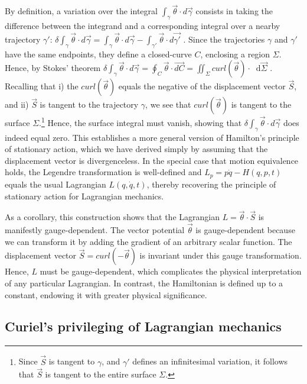 \documentclass[12pt, english, twoside]{article} %
\newcommand{\diff}{\mathop{}\!\mathrm{d}} %
\renewcommand{\vector}[1]{\ensuremath{\vec{#1}}} %
\newcommand{\integral}{\int}
\begin{document}
By definition, a variation over the integral $\integral_{\gamma} \vector{\theta} \cdot d\vector{\gamma}$ consists in taking the difference between the integrand and a corresponding integral over a nearby trajectory $\gamma'$: $\delta \integral_{\gamma} \vector{\theta} \cdot d\vector{\gamma} = \integral_{\gamma} \vector{\theta} \cdot d\vector{\gamma} - \integral_{\gamma'} \vector{\theta} \cdot d\vector{\gamma'}$ . Since the trajectories $\gamma$ and $\gamma'$ have the same endpoints, they define a closed-curve $C$, enclosing a region $\Sigma $. Hence, by Stokes' theorem $\delta \integral_{\gamma} \vector{\theta} \cdot d\vector{\gamma} = \oint_{C} \vector{\theta}  \cdot \vector{dC} = \iint_{\Sigma} curl(\vector{\theta}) \cdot \diff \vector{\Sigma}$ . Recalling that i) the $curl(\vector{\theta})$ equals the negative of the displacement vector $\vector{S}$, and ii)  $\vector{S}$ is tangent to the trajectory $\gamma $, we see that $curl(\vector{\theta})$ is tangent to the surface $\Sigma $.\footnote{Since $\vector{S}$ is tangent to $\gamma $, and $\gamma'$ defines an infinitesimal variation, it follows that $\vector{S}$ is tangent to the entire surface $\Sigma $.} Hence, the surface integral must vanish, showing that $\delta \integral_{\gamma} \vector{\theta} \cdot d\vector{\gamma}$ does indeed equal zero. This establishes a more general version of Hamilton's principle of stationary action, which we have derived simply by assuming that the displacement vector is divergenceless. In the special case that motion equivalence holds, the Legendre transformation is well-defined and $L_p = p \dot{q} - H(q, p, t)$ equals the usual Lagrangian $L(q, \dot{q}, t)$, thereby recovering the principle of stationary action for Lagrangian mechanics. 

As a corollary, this construction shows that the Lagrangian $L =\vector{\theta} \cdot \vector{S} $ is manifestly gauge-dependent. The vector potential $\vector{\theta}$ is gauge-dependent because we can transform it by adding the gradient of an arbitrary scalar function. The displacement vector $\vector{S} = curl(-\vector{\theta})$ is invariant under this gauge transformation. Hence, $L$ must be gauge-dependent, which complicates the physical interpretation of any particular Lagrangian. In contrast, the Hamiltonian is defined up to a constant, endowing it with greater physical significance.


\subsection{Curiel's privileging of Lagrangian mechanics}
\label{Curiel}
\end{document}
